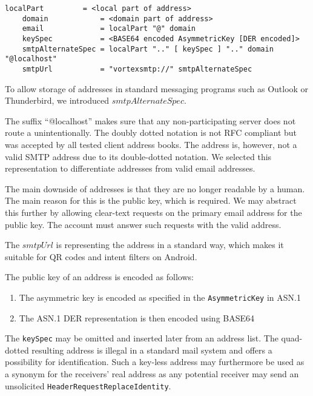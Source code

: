 \begin{lstlisting}[language=EBNF]
	localPart         = <local part of address>
	domain            = <domain part of address>
	email             = localPart "@" domain
	keySpec           = <BASE64 encoded AsymmetricKey [DER encoded]>
	smtpAlternateSpec = localPart ".." [ keySpec ] ".." domain "@localhost"
	smtpUrl           = "vortexsmtp://" smtpAlternateSpec
\end{lstlisting}

To allow storage of \MessageVortex{} addresses in standard messaging programs such as Outlook or Thunderbird, we introduced $smtpAlternateSpec$. 

The suffix ``@localhost'' makes sure that any non-participating server does not route a \VortexMessage{} unintentionally. The doubly dotted notation is not RFC compliant but was accepted by all tested client address books. The address is, however, not a valid SMTP address due to its double-dotted notation. We selected this representation to differentiate \MessageVortex{} addresses from valid email addresses.

The main downside of \MessageVortex{} addresses is that they are no longer readable by a human. The main reason for this is the public key, which is required. We may abstract this further by allowing clear-text requests on the primary email address for the public key. The \MessageVortex{} account must answer such requests with the valid \MessageVortex{} address.

The $smtpUrl$ is representing the address in a standard way, which makes it suitable for QR codes and intent filters on Android.

The public key of an address is encoded as follows:
\begin{enumerate}
	\item The asymmetric key is encoded as specified in the \texttt{AsymmetricKey} in ASN.1
	\item The ASN.1 DER representation is then encoded using BASE64
\end{enumerate}    

The \texttt{keySpec} may be omitted and inserted later from an address list. The quad-dotted resulting address is illegal in a standard mail system and offers a possibility for identification. Such a key-less address may furthermore be used as a synonym for the receivers' real address as any potential receiver may send an unsolicited \texttt{HeaderRequestReplaceIdentity}.

